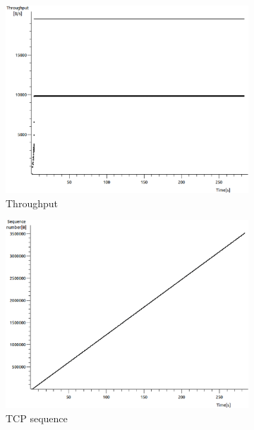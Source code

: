 \documentclass[conference,a4paper]{IEEEtran}
\begin{document}
\begin{figure}
 \centering
 \begin{subfigure}[b]{0.2\textwidth}
  \includegraphics[width=\textwidth]{s4-2_thru}
  \caption{Throughput}
 \end{subfigure}
 \begin{subfigure}[b]{0.2\textwidth}
  \includegraphics[width=\textwidth]{s4-2_seq}
  \caption{TCP sequence}
 \end{subfigure}
 \begin{subfigure}[b]{0.2\textwidth}

\end{subfigure}
\end{figure}
\end{document}
